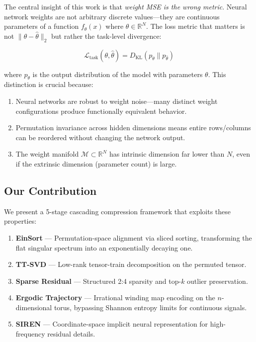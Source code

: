 \documentclass[11pt,a4paper]{article}
\begin{document}
The central insight of this work is that \emph{weight MSE is the wrong metric}. Neural
network weights are not arbitrary discrete values---they are continuous parameters of
a function $f_\theta(x)$ where $\theta \in \mathbb{R}^N$. The loss metric that matters
is not $\|\theta - \hat{\theta}\|_2$ but rather the task-level divergence:

\[
	\mathcal{L}_{\text{task}}(\theta, \hat{\theta}) = D_{\text{KL}}(p_\theta \| p_{\hat{\theta}})
\]

where $p_\theta$ is the output distribution of the model with parameters $\theta$. This
distinction is crucial because:

\begin{enumerate}
	\item Neural networks are robust to weight noise---many distinct weight configurations
	      produce functionally equivalent behavior.
	\item Permutation invariance across hidden dimensions means entire rows/columns can be
	      reordered without changing the network output.
	\item The weight manifold $\mathcal{M} \subset \mathbb{R}^N$ has intrinsic dimension
	      far lower than $N$, even if the extrinsic dimension (parameter count) is large.
\end{enumerate}

\subsection{Our Contribution}

We present a 5-stage cascading compression framework that exploits these properties:

\begin{enumerate}
	\item \textbf{EinSort} --- Permutation-space alignment via sliced sorting, transforming
	      the flat singular spectrum into an exponentially decaying one.
	\item \textbf{TT-SVD} --- Low-rank tensor-train decomposition on the permuted tensor.
	\item \textbf{Sparse Residual} --- Structured 2:4 sparsity and top-$k$ outlier preservation.
	\item \textbf{Ergodic Trajectory} --- Irrational winding map encoding on the
	      $n$-dimensional torus, bypassing Shannon entropy limits for continuous signals.
	\item \textbf{SIREN} --- Coordinate-space implicit neural representation for
	      high-frequency residual details.
\end{enumerate}
\end{document}
